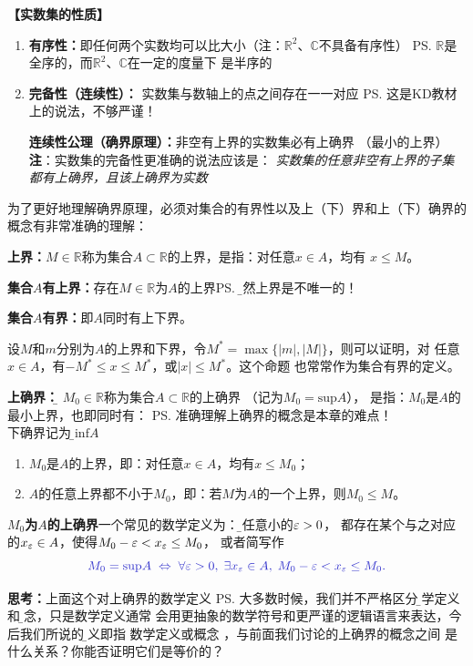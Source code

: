 {\bf 【实数集的性质】}
	\begin{enumerate} 
	  \item {\bf 有序性：}即任何两个实数均可以比大小\quad （注：$\mathbb{R}^2$、$\mathbb{C}$不具备有序性） 
	  \ps{$\mathbb{R}$是全序的，而$\mathbb{R}^2$、$\mathbb{C}$在一定的度量下
	  是半序的}
	  \item {\bf 完备性（连续性）： }实数集与数轴上的点之间存在一一对应
	  \ps{这是KD教材上的说法，不够严谨！}
	  
	  {\bf{连续性公理（确界原理）：}}非空有{上界}的实数集必有{上确界} （最小的上界）\\
	  {\bf 注}：实数集的完备性更准确的说法应该是：
	  {\it 实数集的任意非空有上界的子集都有上确界，且该上确界为实数}
	\end{enumerate}
	
	为了更好地理解确界原理，必须对集合的有界性以及上（下）界和上（下）确界的概念有非常准确的理解：
	
	{\bf 上界：}$M\in\mathbb{R}$称为集合$A\subset\mathbb{R}$的上界，是指：对任意$x\in A$，均有
	$x\leq M$。
	
	{\bf 集合$A$有上界：}存在$M\in\mathbb{R}$为$A$的上界\ps{\b 显然上界是不唯一的！}
	
	{\bf 集合$A$有界：}即$A$同时有上下界。
	
	设$M$和$m$分别为$A$的上界和下界，令$M^*=\max\{|m|,|M|\}$，则可以证明，对
	任意$x\in A$，有$-M^*\leq x\leq M^*$，或$|x|\leq M^*$。这个命题
	也常常作为集合有界的定义。
	
	{\bf 上确界：}{\b
	$M_0\in\mathbb{R}$称为集合$A\subset\mathbb{R}$的上确界
	（记为$M_0=\mathrm{sup}A$），
	是指：$M_0$是$A$的最小上界}，也即同时有：
	\ps{准确理解上确界的概念是本章的难点！\\
	下确界记为：\b$\mathrm{inf}A$}
	\begin{enumerate}[(1)]
	  \setlength{\itemindent}{1cm}
	  \item $M_0$是$A$的上界，即：对任意$x\in A$，均有$x\leq M_0$；
	  \item $A$的任意上界都不小于$M_0$，即：若$M$为$A$的一个上界，则$M_0\leq M$。
	\end{enumerate}
	
	{\bf $M_0$为$A$的上确界}一个常见的数学定义为：{\b 对任意小的$\varepsilon>0$，
	都存在某个与之对应的$x_{\varepsilon}\in A$，使得$M_0-\varepsilon<x_{\varepsilon}\leq M_0$，}
	或者简写作
	$$\b M_0=\mathrm{sup}A\;\Leftrightarrow\;
	\forall\e>0,\;\exists x_{\e}\in A,\;M_0-\e<x_{\e}\leq M_0.$$
	
	{\bf 思考：}上面这个对上确界的数学定义
	\ps{大多数时候，我们并不严格区分{\b 数学定义}和{\b 概念}，只是数学定义通常
	会用更抽象的数学符号和更严谨的逻辑语言来表达，今后我们所说的{\b 定义}即指
	数学定义或概念}
	，与前面我们讨论的上确界的概念之间	是什么关系？你能否证明它们是等价的？
	
